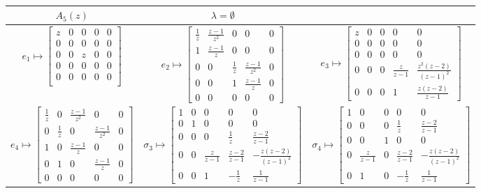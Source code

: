 \documentclass[11pt,a4paper,reqno,svgnames]{amsart}
\theoremstyle{plain}
\theoremstyle{definition}
\numberwithin{equation}{section}
\begin{document}
\begin{landscape}
\ 
\vfill 
\begin{table}[hhh]
\centering
 \begin{tabular}{ccc}
 \toprule
 $A_{5}(z)$ & $\lambda=\emptyset$\\
 \midrule
 ${e}_{1}\mapsto \begin{bmatrix}z&0&0&0&0\\0&0&0&0&0\\ 0&0&z&0&0\\ 0&0&0&0&0\\0&0&0&0&0\\ \end{bmatrix}$ &  
 ${e}_{2}\mapsto{\displaystyle\begin{bmatrix}{\frac{1}{z}}&{\textstyle\frac{z-1}{z^2}}   &0&0&0\\1&{\textstyle\frac{z-1}{z}}&0&0&0\\ 0&0&\frac{1}{z}&\frac{z-1}{z^2}&0\\0&0&1&\frac{z-1}{z}&0\\0&0&0&0&0\end{bmatrix}}$ & 
 ${e}_{3}\mapsto
 \begin{bmatrix}z&0&0&0&0
 \\0&0&0&0&0
 \\0&0&0&0&0
 \\0&0&0&\frac{z}{z-1}&\frac{z^2(z-2)}{(z-1)^2}
 \\0&0&0&1&\frac{z(z-2)}{z-1}
 \end{bmatrix}$ \medskip \\ 
 ${e}_{4}\mapsto\begin{bmatrix}\frac{1}{z}&0&\frac{z-1}{z^2}&0&0\\0&\frac{1}{z}&0&\frac{z-1}{z^2}&0\\1&0&\frac{z-1}{z}&0&0\\0&1&0&\frac{z-1}{z}&0\\0&0&0&0&0\end{bmatrix}$ & 
 ${\sigma}_{3}\mapsto
 \begin{bmatrix}1&0&0&0&0
 \\0&1&0&0&0\\
 0&0&0&\frac{1}{z}&\frac{z-2}{z-1}\\
 0&0&\frac{z}{z-1}&\frac{z-2}{z-1}&-\frac{z(z-2)}{(z-1)^2}\\
 0&0&1&-\frac{1}{z}&\frac{1}{z-1}\end{bmatrix}$ &
 $\sigma_{4}\mapsto
 \begin{bmatrix}1&0&0&0&0\\0&0&0&\frac{1}{z}&\frac{z-2}{z-1}\\0&0&1&0&0\\
 0&\frac{z}{z-1}&0&\frac{z-2}{z-1}&-\frac{z(z-2)}{(z-1)^2}\\0&1&0&-\frac{1}{z}&\frac{1}{z-1}\end{bmatrix}$\medskip\\
 \bottomrule
\end{tabular}
\end{table}
\vfill

\end{landscape}
\end{document}
